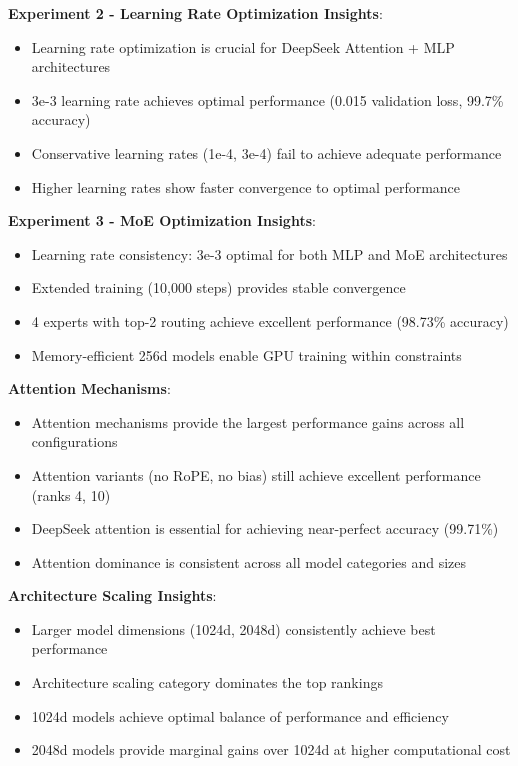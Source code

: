 \documentclass[11pt,a4paper]{article}
\begin{document}
\textbf{Experiment 2 - Learning Rate Optimization Insights}:
\begin{itemize}
    \item Learning rate optimization is crucial for DeepSeek Attention + MLP architectures
    \item 3e-3 learning rate achieves optimal performance (0.015 validation loss, 99.7\% accuracy)
    \item Conservative learning rates (1e-4, 3e-4) fail to achieve adequate performance
    \item Higher learning rates show faster convergence to optimal performance
\end{itemize}

\textbf{Experiment 3 - MoE Optimization Insights}:
\begin{itemize}
    \item Learning rate consistency: 3e-3 optimal for both MLP and MoE architectures
    \item Extended training (10,000 steps) provides stable convergence
    \item 4 experts with top-2 routing achieve excellent performance (98.73\% accuracy)
    \item Memory-efficient 256d models enable GPU training within constraints
\end{itemize}

\textbf{Attention Mechanisms}:
\begin{itemize}
    \item Attention mechanisms provide the largest performance gains across all configurations
    \item Attention variants (no RoPE, no bias) still achieve excellent performance (ranks 4, 10)
    \item DeepSeek attention is essential for achieving near-perfect accuracy (99.71\%)
    \item Attention dominance is consistent across all model categories and sizes
\end{itemize}

\textbf{Architecture Scaling Insights}:
\begin{itemize}
    \item Larger model dimensions (1024d, 2048d) consistently achieve best performance
    \item Architecture scaling category dominates the top rankings
    \item 1024d models achieve optimal balance of performance and efficiency
    \item 2048d models provide marginal gains over 1024d at higher computational cost
\end{itemize}
\end{document}
